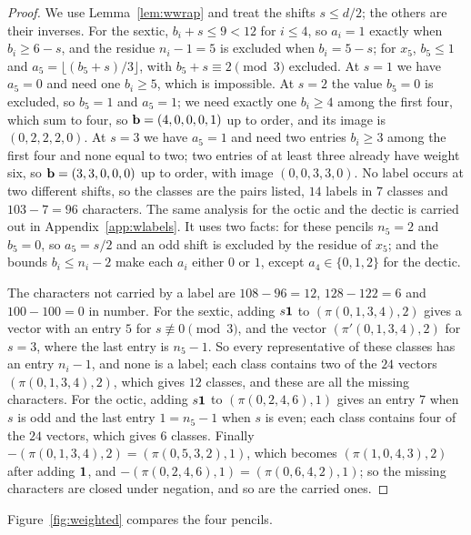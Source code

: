 \begin{proof}
We use Lemma~\ref{lem:wwrap} and treat the shifts $s\le d/2$; the others
are their inverses. For the sextic, $b_i+s\le9<12$ for $i\le4$, so
$a_i=1$ exactly when $b_i\ge6-s$, and the residue $n_i-1=5$ is excluded
when $b_i=5-s$; for $x_5$, $b_5\le1$ and $a_5=\lfloor(b_5+s)/3\rfloor$,
with $b_5+s\equiv2\pmod3$ excluded. At $s=1$ we have $a_5=0$ and need one
$b_i\ge5$, which is impossible. At $s=2$ the value $b_5=0$ is excluded, so
$b_5=1$ and $a_5=1$; we need exactly one $b_i\ge4$ among the first four,
which sum to four, so $\mathbf{b}=(4,0,0,0,1)$ up to order, and its image is
$(0,2,2,2,0)$. At $s=3$ we have $a_5=1$ and need two entries $b_i\ge3$
among the first four and none equal to two; two entries of at least three
already have weight six, so $\mathbf{b}=(3,3,0,0,0)$ up to order, with image
$(0,0,3,3,0)$. No label occurs at two different shifts, so the classes are
the pairs listed, $14$ labels in $7$ classes and $103-7=96$ characters.
The same analysis for the octic and the dectic is carried out in
Appendix~\ref{app:wlabels}. It uses two facts: for these pencils $n_5=2$
and $b_5=0$, so $a_5=s/2$ and an odd shift is excluded by the residue of
$x_5$; and the bounds $b_i\le n_i-2$ make each $a_i$ either $0$ or $1$,
except $a_4\in\{0,1,2\}$ for the dectic.

The characters not carried by a label are $108-96=12$, $128-122=6$ and
$100-100=0$ in number. For the sextic, adding $s\mathbf{1}$ to
$(\pi(0,1,3,4),2)$ gives a vector with an entry $5$ for $s\not\equiv0
\pmod3$, and the vector $(\pi'(0,1,3,4),2)$ for $s=3$, where the last entry
is $n_5-1$. So every representative of these classes has an entry $n_i-1$,
and none is a label; each class contains two of the $24$ vectors
$(\pi(0,1,3,4),2)$, which gives $12$ classes, and these are all the missing
characters. For the octic, adding $s\mathbf{1}$ to $(\pi(0,2,4,6),1)$ gives an
entry $7$ when $s$ is odd and the last entry $1=n_5-1$ when $s$ is even;
each class contains four of the $24$ vectors, which gives $6$ classes.
Finally $-(\pi(0,1,3,4),2)=(\pi(0,5,3,2),1)$, which becomes
$(\pi(1,0,4,3),2)$ after adding $\mathbf{1}$, and $-(\pi(0,2,4,6),1)=
(\pi(0,6,4,2),1)$; so the missing characters are closed under negation,
and so are the carried ones.
\end{proof}

Figure~\ref{fig:weighted} compares the four pencils.

